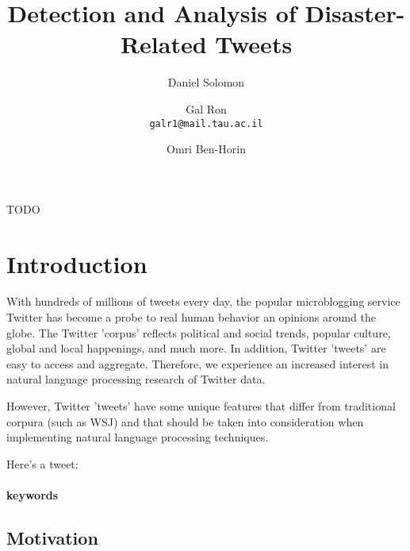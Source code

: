 \documentclass[letterpaper,twocolumn,10pt]{article}
\begin{document}
\date{}

\title{\Large \bf Detection and Analysis of Disaster-Related Tweets}

\author{
{\rm Daniel Solomon}\\
\texttt{}
\and
{\rm Gal Ron}\\
\texttt{galr1@mail.tau.ac.il‬}
\and
{\rm Omri Ben-Horin}\\
\texttt{}
}

\maketitle

\thispagestyle{empty}


\abstract{}
TODO

\section{Introduction}
With hundreds of millions of tweets every day, the popular microblogging service Twitter has become a probe to real human behavior an opinions around the globe. The Twitter 'corpus' reflects political and social trends, popular culture, global and local happenings, and much more. In addition, Twitter 'tweets' are easy to access and aggregate. Therefore, we experience an increased interest in natural language processing research of Twitter data.

However, Twitter 'tweets' have some unique features that differ from traditional corpura (such as WSJ) and that should be taken into consideration when implementing natural language processing techniques.



Here's a tweet: 


\paragraph{keywords}

\subsection{Motivation}
\end{document}
